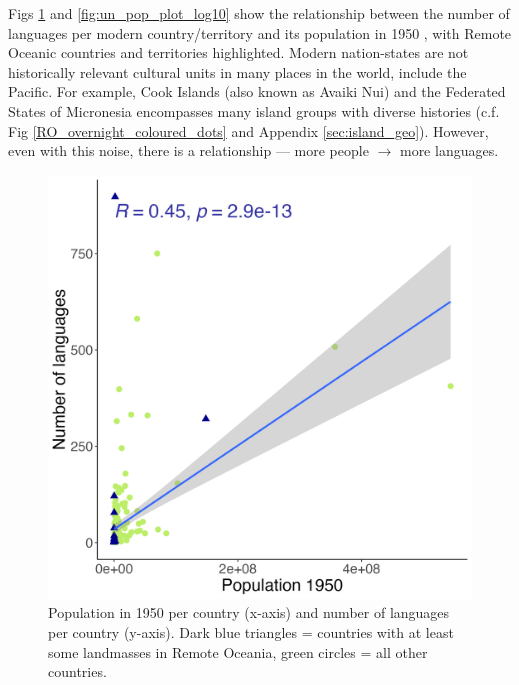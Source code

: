 \documentclass[unnumsec,webpdf,modern,medium]{oup-authoring-template}
\begin{document}
\begin{appendices}
Figs \ref{fig:un_pop_plot} and \ref{fig:un_pop_plot_log10} show the relationship between the number of languages per modern country/territory \citep{glottolog3} and its population in 1950 \citep{UN_pop}, with Remote Oceanic countries and territories highlighted. Modern nation-states are not historically relevant cultural units in many places in the world, include the Pacific. For example, Cook Islands (also known as Avaiki Nui) and the Federated States of Micronesia encompasses many island groups with diverse histories (c.f. Fig \ref{RO_overnight_coloured_dots} and Appendix \ref{sec:island_geo}). However, even with this noise, there is a relationship --- more people $\rightarrow$ more languages.

\begin{figure}[ht]
    \centering
    \includegraphics[width=.7\textwidth]{number_of_languages_vs_pop_1950}
    \caption{Population in 1950 per country (x-axis) and number of languages per country (y-axis). Dark blue triangles = countries with at least some landmasses in Remote Oceania, green circles = all other countries.}
        \label{fig:un_pop_plot}
    \end{figure}
    

\end{appendices}
\end{document}
